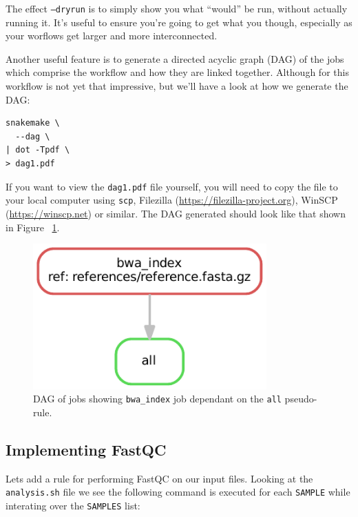 The effect \texttt{--dryrun} is to simply show you what ``would'' be run, without actually running it. It's useful to ensure you're going to get
what you though, especially as your worflows get larger and more interconnected.

Another useful feature is to generate a directed acyclic graph (DAG) of the jobs which comprise the workflow and how they are linked together. Although
for this workflow is not yet that impressive, but we'll have a look at how we generate the DAG:

\begin{lstlisting}
snakemake \
  --dag \
| dot -Tpdf \
> dag1.pdf
\end{lstlisting}

\begin{warning}

If you want to view the \texttt{dag1.pdf} file yourself, you will need to copy the file to your local computer using \texttt{scp},
Filezilla (\url{https://filezilla-project.org}), WinSCP (\url{https://winscp.net}) or similar. The DAG generated should look like
that shown in Figure ~\ref{fig:dag1}.

\end{warning}

\begin{figure}[H]
\centering
\includegraphics[width=0.8\textwidth]{handout/dag1.pdf}
\caption{DAG of jobs showing \texttt{bwa\_index} job dependant on the \texttt{all} pseudo-rule.}
\label{fig:dag1}
\end{figure}

\newpage
\subsection{Implementing FastQC}

Lets add a rule for performing FastQC on our input files. Looking at the \texttt{analysis.sh} file we see the following command
is executed for each \texttt{SAMPLE} while interating over the \texttt{SAMPLES} list:

